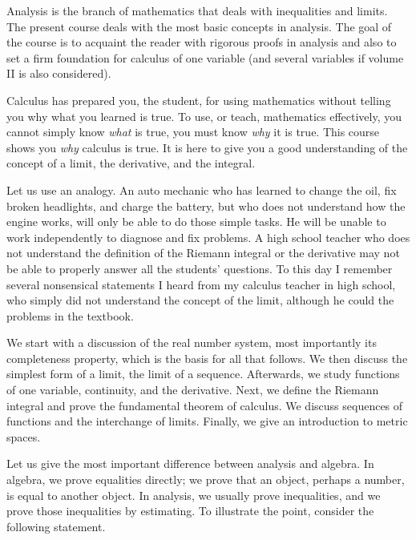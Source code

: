 Analysis is the branch of mathematics that deals with inequalities and
limits.  The present course deals with the most basic 
concepts in analysis.  The goal of the course is to acquaint the reader
with rigorous proofs in analysis and also to
set a firm foundation for calculus of one variable (and several variables if
volume II is also considered).

Calculus has prepared you, the student, for using mathematics without telling
you why what you learned is true.  To use, or teach, mathematics
effectively, you cannot simply know \emph{what} is true, you must know
\emph{why} it is true.  This course shows you \emph{why} calculus
is true.  It is here to give you a good understanding of the concept of a
limit, the derivative, and the integral.

Let us use an analogy.
An auto mechanic who has learned to change the oil, fix broken headlights,
and charge the battery, but who does not understand how the engine
works, will only be able to do those simple tasks.
He will be unable to work independently to diagnose and fix problems.
A high school teacher who does not understand the definition of the Riemann
integral or the derivative may not be able to properly answer all the
students' questions.
To this day I remember several nonsensical statements I heard
from my calculus teacher in high school, who simply did not understand
the concept of the limit, although he could  the problems in the
textbook.

\medskip

We start with a discussion of the real number system, most importantly
its completeness property, which is the basis for all that follows.
We then discuss the simplest form of a limit,
the limit of a sequence.  Afterwards, we study
functions of one variable, continuity, and the derivative.
Next, we define the Riemann integral and prove the fundamental theorem of
calculus.  We discuss sequences of functions and the
interchange of limits.  Finally, we give an introduction to metric
spaces.

\medskip

Let us give the most important difference between analysis and algebra.
In algebra, we prove equalities directly;
we prove that an object, perhaps a number, is equal to another object.
In analysis, we usually prove inequalities,
and we prove those inequalities by estimating.
To illustrate the point, consider the following statement.

\medskip

